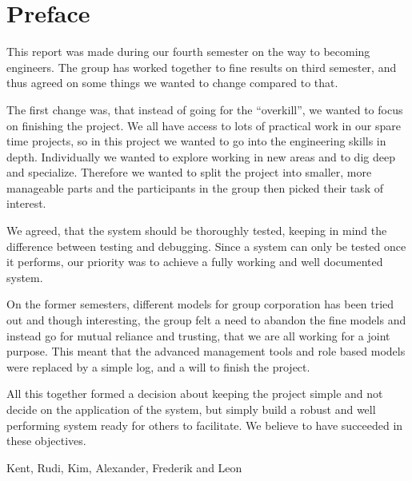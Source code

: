 \chapter*{Preface}
This report was made during our fourth semester on the way to becoming engineers. The group has worked 
together to fine results on third semester, and thus agreed on some things we wanted to change compared 
to that. 

The first change was, that instead of going for the ``overkill'', we wanted to focus on finishing the 
project. We all have access to lots of practical work in our spare time projects, so in this project we 
wanted to go into the engineering skills in depth.
Individually we wanted to explore working in new areas and to dig deep and specialize. Therefore we 
wanted to split the project into smaller, more manageable parts and the participants in the group then 
picked their task of interest.

We agreed, that the system should be thoroughly tested, keeping in mind the difference between testing 
and debugging. Since a system can only be tested once it performs, our priority was to achieve a fully 
working and well documented system.

On the former semesters, different models for group corporation has been tried out and though 
interesting, the group felt a need to abandon the fine models and instead go for mutual reliance and 
trusting, that we are all working for a joint purpose. This meant that the advanced management tools and 
role based models were replaced by a simple log, and a will to finish the project.

All this together formed a decision about keeping the project simple and not decide on the application of 
the system, but simply build a robust and well performing system ready for others to facilitate.
We believe to have succeeded in these objectives.

\vspace*{0.5cm}
\begin{flushright}
Kent, Rudi, Kim, Alexander, Frederik and Leon
\end{flushright}